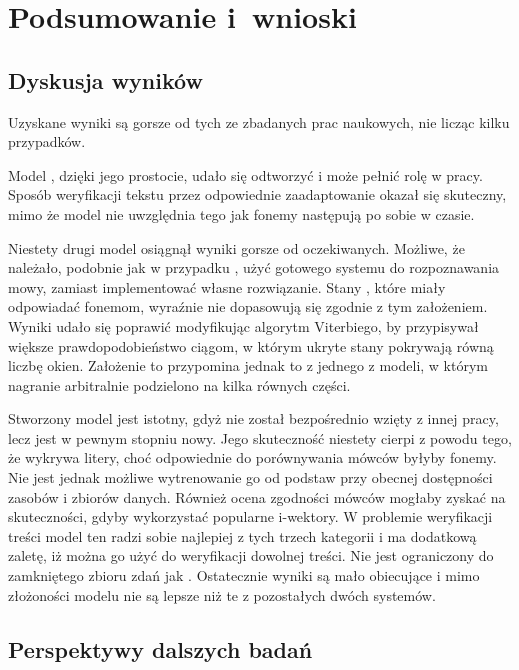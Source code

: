 \chapter{Podsumowanie i~wnioski}\label{chap:podsumowanie}

\section{Dyskusja wyników}

Uzyskane wyniki są gorsze od tych ze zbadanych prac naukowych, nie licząc kilku przypadków.

Model , dzięki jego prostocie, udało się odtworzyć i może pełnić
rolę  w pracy. Sposób weryfikacji tekstu przez odpowiednie zaadaptowanie 
okazał się skuteczny, mimo że model nie uwzględnia tego jak fonemy następują po sobie w czasie.

Niestety drugi model  osiągnął wyniki gorsze od oczekiwanych.
Możliwe, że należało, podobnie jak w przypadku , użyć gotowego systemu do rozpoznawania mowy,
zamiast implementować własne rozwiązanie.
Stany , które miały odpowiadać fonemom, wyraźnie nie dopasowują się zgodnie z tym założeniem.
Wyniki udało się poprawić modyfikując algorytm Viterbiego, by przypisywał większe prawdopodobieństwo
ciągom, w którym ukryte stany pokrywają równą liczbę okien. Założenie to przypomina jednak to z jednego
z modeli, w którym nagranie arbitralnie podzielono na kilka równych części.

Stworzony model  jest istotny, gdyż nie został bezpośrednio wzięty z innej pracy, lecz jest w pewnym
stopniu nowy. Jego skuteczność niestety cierpi z powodu tego, że  wykrywa litery, choć odpowiednie
do porównywania mówców byłyby fonemy. Nie jest jednak możliwe wytrenowanie go od podstaw przy obecnej
dostępności zasobów i zbiorów danych.
Również ocena zgodności mówców mogłaby zyskać na skuteczności, gdyby wykorzystać popularne i-wektory. W problemie weryfikacji
treści model ten radzi sobie najlepiej z tych trzech kategorii i ma dodatkową zaletę, iż można go użyć do weryfikacji
dowolnej treści. Nie jest ograniczony do zamkniętego zbioru zdań jak .
Ostatecznie wyniki są mało obiecujące i mimo złożoności modelu nie są lepsze niż te z pozostałych dwóch systemów.

\section{Perspektywy dalszych badań}

